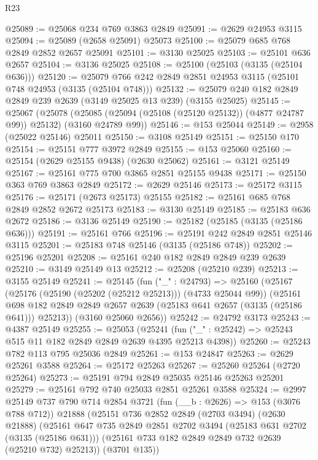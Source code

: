 \begin{lexlean}{R23}
\begin{coremodule}
@25089 := @25068 @234 @769 @3863 @2849
@25091 := @2629 @24953 @3115
@25094 := @25089 (@2658 @25091) @25073
@25100 := @25079 @685 @768 @2849 @2852 @2657 @25091
@25101 := @3130 @25025
@25103 := @25101 @636 @2657
@25104 := @3136 @25025
@25108 := @25100 (@25103 (@3135 (@25104 @636)))
@25120 := @25079 @766 @242 @2849 @2851 @24953 @3115 (@25101 @748 @24953 (@3135 (@25104 @748)))
@25132 := @25079 @240 @182 @2849 @2849 @239 @2639 (@3149 @25025 @13 @239) (@3155 @25025)
@25145 := @25067
    (@25078 (@25085 (@25094 (@25108 (@25120 @25132)) (@4877 @24787 @99)) @25132) (@3160 @24789 @99))
@25146 := @153 @25044
@25149 := @2958 (@25022 @25146) @25011
@25150 := @3108 @25149
@25151 := @25150 @170
@25154 := @25151 @777 @3972 @2849
@25155 := @153 @25060
@25160 := @25154 (@2629 @25155 @9438) (@2630 @25062)
@25161 := @3121 @25149
@25167 := @25161 @775 @700 @3865 @2851 @25155 @9438
@25171 := @25150 @363 @769 @3863 @2849
@25172 := @2629 @25146
@25173 := @25172 @3115
@25176 := @25171 (@2673 @25173) @25155
@25182 := @25161 @685 @768 @2849 @2852 @2672 @25173
@25183 := @3130 @25149
@25185 := @25183 @636 @2672
@25186 := @3136 @25149
@25190 := @25182 (@25185 (@3135 (@25186 @636)))
@25191 := @25161 @766
@25196 := @25191 @242 @2849 @2851 @25146 @3115
@25201 := @25183 @748 @25146 (@3135 (@25186 @748))
@25202 := @25196 @25201
@25208 := @25161 @240 @182 @2849 @2849 @239 @2639
@25210 := @3149 @25149 @13
@25212 := @25208 (@25210 @239)
@25213 := @3155 @25149
@25241 := @25145
    (fun ("_" : @24793) =>
    @25160
      (@25167
        (@25176 (@25190 (@25202 (@25212 @25213))) (@4733 @25044 @99))
        (@25161 @698 @182 @2849 @2849 @2657 @2639 (@25183 @641 @2657 (@3135 (@25186 @641))) @25213))
      (@3160 @25060 @2656))
@25242 := @24792 @3173
@25243 := @4387 @25149
@25255 := @25053
    (@25241 (fun ("_" : @25242) => @25243 @515 @11 @182 @2849 @2849 @2639 @4395 @25213 @4398))
@25260 := @25243 @782 @113 @795 @25036 @2849
@25261 := @153 @24847
@25263 := @2629 @25261 @3588
@25264 := @25172 @25263
@25267 := @25260 @25264 (@2720 @25264)
@25273 := @25191 @794 @2849 @25035 @25146 @25263 @25201
@25279 := @25161 @792 @740 @25033 @2851 @25261 @3588
@25324 := @2997
    @25149
    @737
    @790
    @714
    @2854
    @3721
    (fun (__b : @2626) => @153 (@3076 @788 @712))
    @21888
    (@25151
      @736
      @2852
      @2849
      (@2703 @3494)
      (@2630 @21888)
      (@25161
        @647
        @735
        @2849
        @2851
        @2702
        @3494
        (@25183 @631 @2702 (@3135 (@25186 @631)))
        (@25161 @733 @182 @2849 @2849 @732 @2639 (@25210 @732) @25213))
      (@3701 @135))

\end{coremodule}
\end{lexlean}
